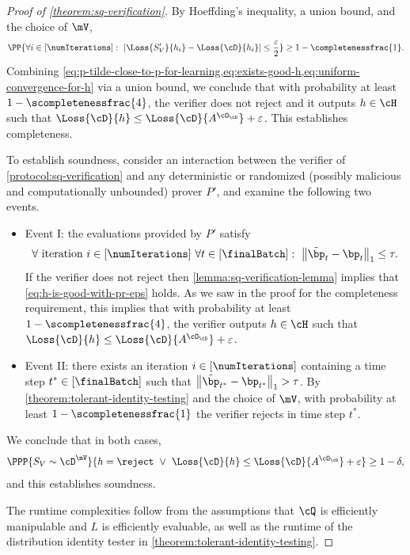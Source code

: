 \documentclass{toc}
\begin{document}
\begin{proof}[Proof of \cref{theorem:sq-verification}]
	By Hoeffding's inequality, a union bound, and the choice of $\mV$, 
	\begin{equation}\label{eq:uniform-convergence-for-h}
		\PP{\forall i \in [\numIterations]: ~ \left|\Loss{S_V'}{h_i} - \Loss{\cD}{h_i}\right| \leq \frac{\varepsilon}{2}} \geq 1-\completenessfrac{1}.
	\end{equation}
	Combining \cref{eq:p-tilde-close-to-p-for-learning,eq:exists-good-h,eq:uniform-convergence-for-h} via a union bound, we conclude that with probability at least $1-\scompletenessfrac{4}$, the verifier does not reject and it outputs $h \in \cH$ such that $\Loss{\cD}{h} \leq \Loss{\cD}{A^{\cO_\cD}} + \varepsilon$. This establishes completeness.
	
	To establish soundness, consider an interaction between the verifier of \cref{protocol:sq-verification} and any deterministic or randomized (possibly malicious and computationally unbounded) prover $P'$, and examine the following two events.
	
	\begin{itemize}
		\item{
			Event I: the evaluations provided by $P'$ satisfy 
			\begin{equation}\label{eq:p-tilde-close-to-p-for-verification}
				\forall \text{ iteration } i \in [\numIterations] ~ \forall t \in [\finalBatch]: ~  \left\|\tilde{\bp}_t  - \bp_t\right\|_1 \leq \tau.
			\end{equation}
			If the verifier does not reject then \cref{lemma:sq-verification-lemma} implies that \cref{eq:h-is-good-with-pr-eps} holds. As we saw in the proof for the completeness requirement, this implies that with probability at least $1-\scompletenessfrac{4}$, the verifier outputs $h \in \cH$ such that $\Loss{\cD}{h} \leq \Loss{\cD}{A^{\cO_\cD}} + \varepsilon$.
		
		}
		\item{
			Event II: there exists an iteration $i \in [\numIterations]$ containing a time step $t^* \in [\finalBatch]$ such that $\left\|\tilde{\bp}_{t^*}  - \bp_{t^*}\right\|_1 > \tau$. By \cref{theorem:tolerant-identity-testing} and the choice of $\mV$, with probability at least $1-\scompletenessfrac{1}$ the verifier rejects in time step $t^*$.
		}
	\end{itemize}
	We conclude that in both cases, 
	\[
		\PPP{S_V \sim \cD^{\mV}}{h = \reject ~ \lor ~ \Loss{\cD}{h} \leq \Loss{\cD}{A^{\cO_\cD}} + \varepsilon} \geq 1-\delta,
	\]
	and this establishes soundness.

	The runtime complexities follow from the assumptions that $\cQ$ is efficiently manipulable and $L$ is efficiently evaluable, as well as the runtime of the distribution identity tester in \cref{theorem:tolerant-identity-testing}.
\end{proof}
\end{document}
